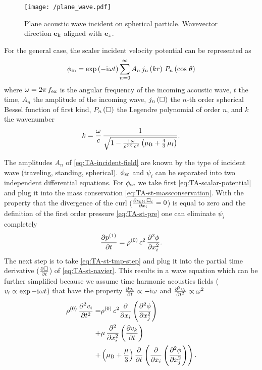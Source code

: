 \begin{figure}[tbp]
  \centering
  \texttt{[image: /plane\_wave.pdf]}
  \caption{Plane acoustic wave incident on spherical particle. Wavevector 
  direction $\vb{e}_{\mathrm{k}}$ aligned with $\vb{e}_{z}$.}
  \label{fig:TA-plane_wave}
\end{figure}

For the general case, the scaler incident velocity potential can be represented 
as
\begin{equation}
  \phi_{\mathrm{in}} = \exp\left( -\mathrm{i}\mkern1mu\omega t \right) \sum\limits_{n=0}^{\infty} 
  A_{n}\,j_{n}\left(kr\right)\,P_{n}\left(\cos\,\theta\right)
  \label{eq:TA-incident-field}
\end{equation}
where $\omega=2\pi\,f_{\mathrm{ex}}$ is the angular frequency of the incoming acoustic 
wave, $t$ the time, $A_{n}$ the amplitude of the incoming wave, 
$j_{n}\left(\Box\right)$ the $n$-th order spherical Bessel function of first kind, 
$P_{n}\left(\Box\right)$ the Legendre polynomial of order $n$, and $k$ the 
wavenumber
\begin{equation}
  k = 
  \frac{\omega}{c}\,\frac{1}{\sqrt{1-\frac{\mathrm{i}\mkern1mu\,\omega}{\rho^{(0)}\,c^{2}} 
  \left( \mu_{\mathrm{B}} + \frac{4}{3}\,\mu_{\mathrm{f}} \right)}}.
  \label{eq:TA-wavenumber}
\end{equation}

The amplitudes $A_{n}$ of \cref{eq:TA-incident-field} are known by the type of 
incident wave (traveling, standing, spherical). $\phi_{\mathrm{sc}}$ and 
$\psi_{i}$ can be separated into two independent differential equations. For 
$\phi_{\mathrm{sc}}$ we take first \cref{eq:TA-scalar-potential} and plug it into 
the mass conservation \cref{eq:TA-st-massconservation}. With the property that 
the divergence of the curl ($\pdv{\epsilon_{kli}\,\Box_{i}}{x_{i}} = 0$) is 
equal to zero and the definition of the first order pressure 
\cref{eq:TA-st-pre} one can eliminate $\psi_{i}$ completely
\begin{equation}
  \pdv{  p^{(1)}  }{t} = \rho^{(0)}\,c^{2}\,\pdv[2]{\phi}{x_{i}}.
  \label{eq:TA-st-tmp-step}
\end{equation}
The next step is to take \cref{eq:TA-st-tmp-step} and plug it into the partial 
time derivative ($\pdv{\Box}{t}$) of \cref{eq:TA-st-navier}. This results in a 
wave equation which can be further simplified because we assume time harmonic 
acoustics fields ($v_{i}\propto\exp -\mathrm{i}\mkern1mu\omega t$) that have the property 
$\pdv{v_{i}}{t}\propto -\mathrm{i}\mkern1mu\omega$ and
$\pdv[2]{v_{i}}{t}\propto \omega^{2}$
\begin{equation}
  \label{eq:TA-st-nd-tmp-step}
\begin{split}
  \rho^{(0)}\,\pdv[2]{v_{i}}{t} = & 
  \rho^{(0)}\,c^{2}\pdv{x_{i}}\left( \pdv[2]{\phi}{x_{j}} \right) \\
  + & \mu\,\pdv[2]{x_{i}}\left( \pdv{v_{k}}{t} \right) \\
    + & \left(\mu_{\mathrm{B}} + \frac{\mu}{3}\right)\pdv{t}
    \left( \pdv{x_{i}}\left( \pdv[2]{\phi}{x_{j}} \right) \right).
\end{split}
\end{equation}

